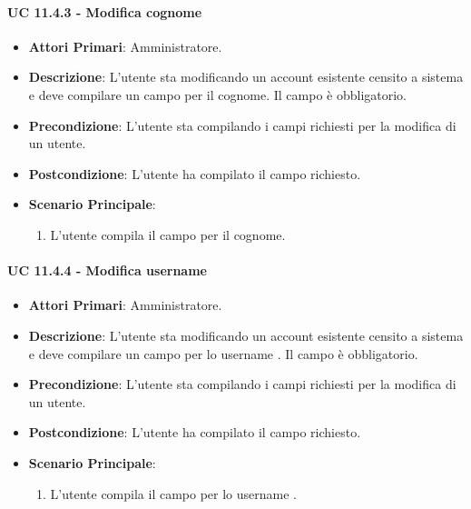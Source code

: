 				\paragraph{UC 11.4.3 - Modifica cognome}
				\begin{itemize}
					\item \textbf{Attori Primari}: Amministratore.
					\item \textbf{Descrizione}: L'utente sta modificando un account esistente censito a sistema e deve compilare un campo per il cognome. Il campo è obbligatorio.
					\item \textbf{Precondizione}: L'utente sta compilando i campi richiesti per la modifica di un utente.
					\item \textbf{Postcondizione}: L'utente ha compilato il campo richiesto.
					\item \textbf{Scenario Principale}:
					\begin{enumerate}
						\item{L'utente compila il campo per il cognome.}
					\end{enumerate}	
				\end{itemize}

				\paragraph{UC 11.4.4 - Modifica username }
				\begin{itemize}
					\item \textbf{Attori Primari}: Amministratore.
					\item \textbf{Descrizione}: L'utente sta modificando un account esistente censito a sistema e deve compilare un campo per lo username . Il campo è obbligatorio.
					\item \textbf{Precondizione}: L'utente sta compilando i campi richiesti per la modifica di un utente.
					\item \textbf{Postcondizione}: L'utente ha compilato il campo richiesto.
					\item \textbf{Scenario Principale}:
					\begin{enumerate}
						\item{L'utente compila il campo per lo username .}
					\end{enumerate}	
				\end{itemize}

